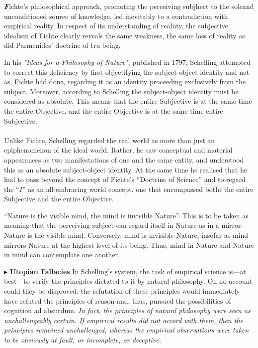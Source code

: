 \documentclass[9pt,a4paper,twocolumn]{article}
\newcounter{def}
\newenvironment{callout}
	{\begin{calloutbox}\color{charcoal}\textbf\textit}
	{\end{calloutbox}}
\newcommand{\newpoint}[1]{\indent$\blacktriangleright$ \textbf{#1}}
\begin{document}
                \begin{callout}
                    Fichte's philosophical approach, promoting the perceiving subjhect to the soleand unconditioned source of knowledge, led inevitably to a contradiction with empirical reality. In respect of its understanding of realuty, the subjective idealism of Fichte clearly reveals the same weakness, the same loss of reality as did Parmenides' doctrine of tru being.
                \end{callout}
                In his \textit{"Ideas for a Philosophy of Nature"}, published in 1797, Schelling attempted to correct this deficiency by first objectifying the subject-object identity and not as, Fichte had done, regarding it as an identity proceeding exclusively from the subject. Moreover, according to Schelling the subject-object identity must be considered as absolute. This means that the entire Subjective is at the same time the entire Objective, and the entire Objective is at the same time entire Subjective.
                \\
                \\
                Unlike Fichte, Schelling regarded the real world as more than just an epiphenomenon of the ideal world. Rather, he saw conceptual and material appearances as two manifestations of one and the same entity, and understood this as an absolute subject-object identity. At the same time he realised that he had to pass beyond the concept of Fichte's “Doctrine of Science” and to regard the “$I$” as an all-embracing world concept, one that encompassed botht the entire Subjective and the entire Objective. 
            \begin{qt}
                “Nature is the visible mind, the mind is invisible Nature”. This is to be taken as meaning that the perceiving subject can regard itself in Nature as in a mirror. Nature is the visible mind. Conversely, mind is invisible Nature, insofar as mind mirrors Nature at the highest level of its being. Thus, mind in Nature and Nature in mind can contemplate one another.
            \end{qt}
            \newpoint{Utopian Fallacies}
            In Schelling's system, the task of empirical science is—at best—to verify the principles dictated to it by natural philosophy. On no account could they be disproved: the refutation of these principles would immediately have refuted the principles of reason and, thus, pursued the possibilities of cognition ad absurdum. \textit{In fact, the principles of natural philosophy were seen as unchallengeably certain. If empirical results did not accord with them, then the principles remained unchallenged, whereas the empirical observations were taken to be obviously at fault, or incomplete, or deceptive.}
\end{document}
